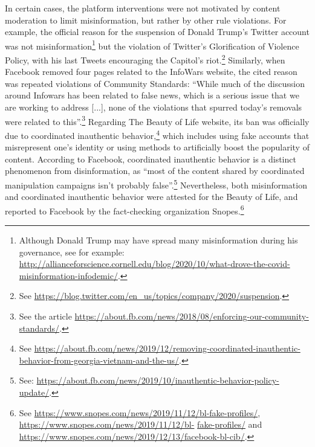 \documentclass{article}
\begin{document}
In certain cases, the platform interventions were not motivated by content moderation to limit misinformation, but rather by other rule violations.
For example, the official reason for the suspension of Donald Trump's Twitter account was not misinformation\footnote{Although Donald Trump may have spread many misinformation during his governance, see for example: \href{http://allianceforscience.cornell.edu/blog/2020/10/what-drove-the-covid-misinformation-infodemic/}{http://allianceforscience.cornell.edu/blog/2020/10/what-drove-the-covid-misinformation-infodemic/}.}
but the violation of Twitter's Glorification of Violence Policy, with his last Tweets encouraging the Capitol's riot.\footnote{See \href{https://blog.twitter.com/en\_us/topics/company/2020/suspension}{https://blog.twitter.com/en\_us/topics/company/2020/suspension}.}
Similarly, when Facebook removed four pages related to the InfoWars website, the cited reason was repeated violations of Community Standards: 
``While much of the discussion around Infowars has been related to false news, which is a serious issue that we are working to address [...], none of the violations that spurred today’s removals were related to this''.\footnote{See the article \href{https://about.fb.com/news/2018/08/enforcing-our-community-standards/}{https://about.fb.com/news/2018/08/enforcing-our-community-standards/}.}
Regarding The Beauty of Life website, its ban was officially due to coordinated inauthentic behavior,\footnote{See \href{https://about.fb.com/news/2019/12/removing-coordinated-inauthentic-behavior-from-georgia-vietnam-and-the-us/}{https://about.fb.com/news/2019/12/removing-coordinated-inauthentic-behavior-from-georgia-vietnam-and-the-us/}.} 
which includes using fake accounts that misrepresent one's identity or using methods to artificially boost the popularity of content. 
According to Facebook, coordinated inauthentic behavior is a distinct phenomenon from disinformation, as ``most of the content shared by coordinated manipulation campaigns isn’t probably false''.\footnote{See: \href{https://about.fb.com/news/2019/10/inauthentic-behavior-policy-update/}{https://about.fb.com/news/2019/10/inauthentic-behavior-policy-update/}.} 
Nevertheless, both misinformation and coordinated inauthentic behavior were attested for the Beauty of Life, and reported to Facebook by the fact-checking organization Snopes.\footnote{See \href{ https://www.snopes.com/news/2019/11/12/bl-fake-profiles/}{https://www.snopes.com/news/2019/11/12/bl-fake-profiles/}, 
\href{https://www.snopes.com/news/2019/11/12/bl-fake-profiles/}{https://www.snopes.com/news/2019/11/12/bl-} \href{https://www.snopes.com/news/2019/11/12/bl-fake-profiles/}{fake-profiles/}  and 
\href{https://www.snopes.com/news/2019/12/13/facebook-bl-cib/}{https://www.snopes.com/news/2019/12/13/facebook-bl-cib/}.} 
\end{document}
